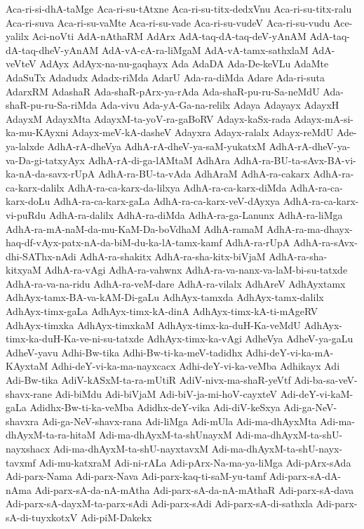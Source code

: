 {Aca-ri-si-dhA-taMge
Aca-ri-su-tAtxne
Aca-ri-su-titx-dedxVnu
Aca-ri-su-titx-ralu
Aca-ri-suva
Aca-ri-su-vaMte
Aca-ri-su-vade
Aca-ri-su-vudeV
Aca-ri-su-vudu
Ace-yalilx
Aci-noVti
AdA-nAthaRM
AdArx
AdA-taq-dA-taq-deV-yAnAM
AdA-taq-dA-taq-dheV-yAnAM
AdA-vA-cA-ra-liMgaM
AdA-vA-tamx-sathxlaM
AdA-veVteV
AdAyx
AdAyx-na-nu-gaqhayx
Ada
AdaDA
Ada-De-keVLu
AdaMte
AdaSuTx
Adadudx
Adadx-riMda
AdarU
Ada-ra-diMda
Adare
Ada-ri-suta
AdarxRM
AdashaR
Ada-shaR-pArx-ya-rAda
Ada-shaR-pu-ru-Sa-neMdU
Ada-shaR-pu-ru-Sa-riMda
Ada-vivu
Ada-yA-Ga-na-relilx
Adaya
Adayayx
AdayxH
AdayxM
AdayxMta
AdayxM-ta-yoV-ra-gaBoRV
Adayx-kaSx-rada
Adayx-mA-si-ka-mu-KAyxni
Adayx-meV-kA-dasheV
Adayxra
Adayx-ralalx
Adayx-reMdU
Ade-ya-lalxde
AdhA-rA-dheVya
AdhA-rA-dheV-ya-saM-yukatxM
AdhA-rA-dheV-ya-va-Da-gi-tatxyAyx
AdhA-rA-di-ga-lAMtaM
AdhAra
AdhA-ra-BU-ta-sAvx-BA-vi-ka-nA-da-savx-rUpA
AdhA-ra-BU-ta-vAda
AdhAraM
AdhA-ra-cakarx
AdhA-ra-ca-karx-dalilx
AdhA-ra-ca-karx-da-lilxya
AdhA-ra-ca-karx-diMda
AdhA-ra-ca-karx-doLu
AdhA-ra-ca-karx-gaLa
AdhA-ra-ca-karx-veV-dAyxya
AdhA-ra-ca-karx-vi-puRdu
AdhA-ra-dalilx
AdhA-ra-diMda
AdhA-ra-ga-Lanunx
AdhA-ra-liMga
AdhA-ra-mA-naM-da-mu-KaM-Da-boVdhaM
AdhA-ramaM
AdhA-ra-ma-dhayx-haq-df-vAyx-patx-nA-da-biM-du-ka-lA-tamx-kamf
AdhA-ra-rUpA
AdhA-ra-sAvx-dhi-SAThx-nAdi
AdhA-ra-shakitx
AdhA-ra-sha-kitx-biVjaM
AdhA-ra-sha-kitxyaM
AdhA-ra-vAgi
AdhA-ra-vahwnx
AdhA-ra-va-nanx-va-laM-bi-su-tatxde
AdhA-ra-va-na-ridu
AdhA-ra-veM-dare
AdhA-ra-vilalx
AdhAreV
AdhAyxtamx
AdhAyx-tamx-BA-va-kAM-Di-gaLu
AdhAyx-tamxda
AdhAyx-tamx-dalilx
AdhAyx-timx-gaLa
AdhAyx-timx-kA-dinA
AdhAyx-timx-kA-ti-mAgeRV
AdhAyx-timxka
AdhAyx-timxkaM
AdhAyx-timx-ka-duH-Ka-veMdU
AdhAyx-timx-ka-duH-Ka-ve-ni-su-tatxde
AdhAyx-timx-ka-vAgi
AdheVya
AdheV-ya-gaLu
AdheV-yavu
Adhi-Bw-tika
Adhi-Bw-ti-ka-meV-tadidhx
Adhi-deY-vi-ka-mA-KAyxtaM
Adhi-deY-vi-ka-ma-nayxcacx
Adhi-deY-vi-ka-veMba
Adhikayx
Adi
Adi-Bw-tika
AdiV-kASxM-ta-ra-mUtiR
AdiV-nivx-ma-shaR-yeVtf
Adi-ba-sa-veV-shavx-rane
Adi-biMdu
Adi-biVjaM
Adi-biV-ja-mi-hoV-cayxteV
Adi-deY-vi-kaM-gaLa
Adidhx-Bw-ti-ka-veMba
Adidhx-deY-vika
Adi-diV-keSxya
Adi-ga-NeV-shavxra
Adi-ga-NeV-shavx-rana
Adi-liMga
Adi-mUla
Adi-ma-dhAyxMta
Adi-ma-dhAyxM-ta-ra-hitaM
Adi-ma-dhAyxM-ta-shUnayxM
Adi-ma-dhAyxM-ta-shU-nayxshacx
Adi-ma-dhAyxM-ta-shU-nayxtavxM
Adi-ma-dhAyxM-ta-shU-nayx-tavxmf
Adi-mu-katxraM
Adi-ni-rALa
Adi-pArx-Na-ma-ya-liMga
Adi-pArx-sAda
Adi-parx-Nama
Adi-parx-Nava
Adi-parx-kaq-ti-saM-yu-tamf
Adi-parx-sA-dA-nAma
Adi-parx-sA-da-nA-mAtha
Adi-parx-sA-da-nA-mAthaR
Adi-parx-sA-dava
Adi-parx-sA-dayxM-ta-parx-sAdi
Adi-parx-sAdi
Adi-parx-sA-di-sathxla
Adi-parx-sA-di-tuyxkotxV
Adi-piM-Dakekx
}
